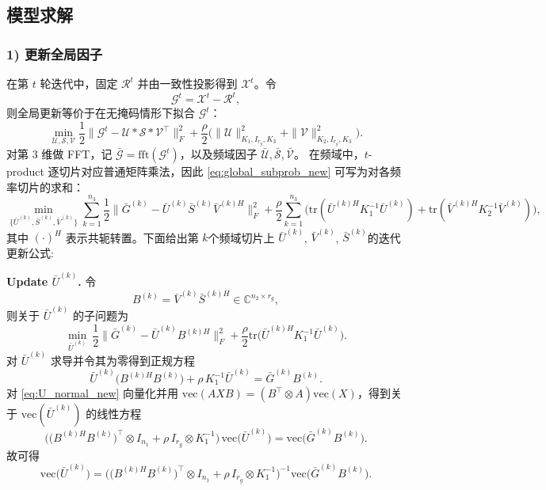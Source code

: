 \documentclass[UTF8]{ctexart}
\begin{document}
\subsection{模型求解}
\label{sec:solution}

\subsubsection*{1) 更新全局因子}
在第 $t$ 轮迭代中，固定 $\mathcal{R}^t$ 并由一致性投影得到 $\mathcal{X}^t$。令
\[
\mathcal{G}^t=\mathcal{X}^t-\mathcal{R}^t,
\]
则全局更新等价于在无掩码情形下拟合 $\mathcal{G}^t$：
\begin{equation}
\min_{\mathcal{U},\mathcal{S},\mathcal{V}}
\frac12\big\|\mathcal{G}^t-\mathcal{U}*\mathcal{S}*\mathcal{V}^{\top}\big\|_F^2
+\frac{\rho}{2}\Big(\|\mathcal{U}\|^{2}_{K_1,I_{r_g},K_3}+\|\mathcal{V}\|^{2}_{K_2,I_{r_g},K_3}\Big).
\label{eq:global_subprob_new}
\end{equation}
对第 $3$ 维做 FFT，记 $\bar{\mathcal{G}}=\mathrm{fft}(\mathcal{G}^t)$，以及频域因子 $\bar{\mathcal{U}},\bar{\mathcal{S}},\bar{\mathcal{V}}$。
在频域中，$t$-product 逐切片对应普通矩阵乘法，因此 \eqref{eq:global_subprob_new} 可写为对各频率切片的求和：
\begin{equation}
\min_{\{\bar U^{(k)},\bar S^{(k)},\bar V^{(k)}\}}
\sum_{k=1}^{n_3}\frac12\big\|\bar G^{(k)}-\bar U^{(k)}\bar S^{(k)}\bar V^{(k)H}\big\|_F^2
+\frac{\rho}{2}\sum_{k=1}^{n_3}\Big(\mathrm{tr}(\bar U^{(k)H}K_1^{-1}\bar U^{(k)})+\mathrm{tr}(\bar V^{(k)H}K_2^{-1}\bar V^{(k)})\Big),
\label{eq:global_freq_sum}
\end{equation}
其中 $(\cdot)^H$ 表示共轭转置。下面给出第 $k$个频域切片上 $\bar U^{(k)}$, $\bar V^{(k)}$, $\bar S^{(k)}$的迭代更新公式:

\noindent\textbf{Update $\bar U^{(k)}$.}
令
\[
B^{(k)}=\bar V^{(k)}\bar S^{(k)H}\in\mathbb{C}^{n_2\times r_g},
\]
则关于 $\bar U^{(k)}$ 的子问题为
\[
\min_{\bar U^{(k)}}\ 
\frac{1}{2}\big\|\bar G^{(k)}-\bar U^{(k)}B^{(k)H}\big\|_F^2
+\frac{\rho}{2}\mathrm{tr}\!\big(\bar U^{(k)H}K_1^{-1}\bar U^{(k)}\big).
\]
对 $\bar U^{(k)}$ 求导并令其为零得到正规方程
\begin{equation}
\bar U^{(k)}\big(B^{(k)H}B^{(k)}\big)+\rho\,K_1^{-1}\bar U^{(k)}=\bar G^{(k)}B^{(k)}.
\label{eq:U_normal_new}
\end{equation}
对 \eqref{eq:U_normal_new} 向量化并用 $\mathrm{vec}(AXB)=(B^{\top}\otimes A)\mathrm{vec}(X)$，得到关于 $\mathrm{vec}(\bar U^{(k)})$ 的线性方程
\begin{equation}
\Big(\big(B^{(k)H}B^{(k)}\big)^{\top}\otimes I_{n_1}+\rho\,I_{r_g}\otimes K_1^{-1}\Big)\,
\mathrm{vec}\!\big(\bar U^{(k)}\big)
=
\mathrm{vec}\!\big(\bar G^{(k)}B^{(k)}\big).
\label{eq:U_vec_system}
\end{equation}
故可得
\begin{equation}
\mathrm{vec}\!\big(\bar U^{(k)}\big)
=\Big(\big(B^{(k)H}B^{(k)}\big)^{\top}\otimes I_{n_1}+\rho\,I_{r_g}\otimes K_1^{-1}\Big)^{-1}
\mathrm{vec}\!\big(\bar G^{(k)}B^{(k)}\big).
\end{equation}
\end{document}
